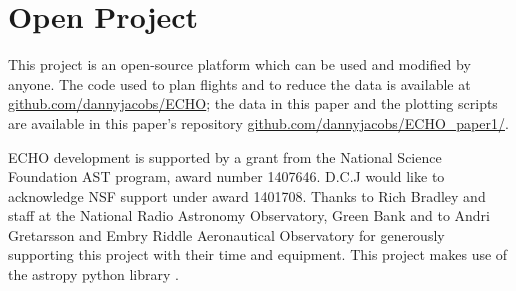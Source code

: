 \documentclass[preprint2,numberedappendix,tighten,twocolappendix]{aastex6}
\begin{document}
\section*{Open Project}
This project is an open-source platform which can be used and modified by anyone. The code used to plan flights and to reduce the data is available at \url{github.com/dannyjacobs/ECHO}; the data in this paper and the plotting scripts are available in this paper's repository \url{github.com/dannyjacobs/ECHO_paper1/}.





\acknowledgments
ECHO development is supported by a grant from the National Science Foundation AST program, award number 1407646. D.C.J would like to acknowledge NSF support  under award 1401708.
Thanks to Rich Bradley and staff at the National Radio Astronomy Observatory, Green Bank and to Andri Gretarsson and Embry Riddle Aeronautical Observatory for generously supporting this project with their time and equipment. This project makes use of the astropy python library \citep{2013Robitaille_Astropy}.



\end{document}
